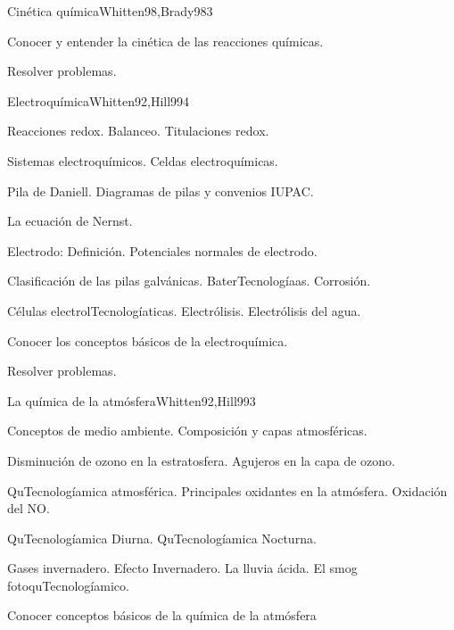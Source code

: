 \begin{syllabus}
\begin{unit}{Cinética química}{Whitten98,Brady98}{3}
   \begin{unitgoals}
      \item Conocer y entender la cinética de las reacciones químicas.
      \item Resolver problemas.
   \end{unitgoals}
\end{unit}

\begin{unit}{Electroquímica}{Whitten92,Hill99}{4}
\begin{topics}
      \item Reacciones redox. Balanceo. Titulaciones redox.
      \item Sistemas electroquímicos. Celdas electroquímicas.
      \item Pila de Daniell. Diagramas de pilas y convenios IUPAC.
      \item La ecuación de Nernst.
      \item Electrodo: Definición. Potenciales normales de electrodo.
      \item Clasificación de las pilas galvánicas. BaterTecnologíaas. Corrosión.
      \item Células electrolTecnologíaticas. Electrólisis. Electrólisis del agua.
   \end{topics}

   \begin{unitgoals}
      \item Conocer los conceptos básicos de la electroquímica.
      \item Resolver problemas.
   \end{unitgoals}
\end{unit}

\begin{unit}{La química de la atmósfera}{Whitten92,Hill99}{3}
\begin{topics}
      \item Conceptos de medio ambiente. Composición y capas atmosféricas.
      \item Disminución de ozono en la estratosfera. Agujeros en la capa de ozono.
      \item QuTecnologíamica atmosférica. Principales oxidantes en la atmósfera. Oxidación del NO.
      \item QuTecnologíamica Diurna. QuTecnologíamica Nocturna.
      \item Gases invernadero. Efecto Invernadero. La lluvia ácida. El smog fotoquTecnologíamico.
    \end{topics}

   \begin{unitgoals}
      \item Conocer conceptos básicos de la química de la atmósfera
   \end{unitgoals}
\end{unit}

\begin{coursebibliography}
\end{coursebibliography}
\end{syllabus}
